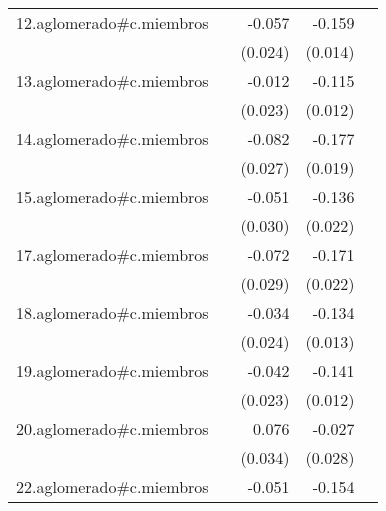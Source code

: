 {\begin{longtable}{l*{4}{D{.}{.}{-1}}}
\addlinespace
12.aglomerado#c.miembros&                     &      -0.057\sym{*}  &      -0.159\sym{***}&                     \\
            &                     &     (0.024)         &     (0.014)         &                     \\
\addlinespace
13.aglomerado#c.miembros&                     &      -0.012         &      -0.115\sym{***}&                     \\
            &                     &     (0.023)         &     (0.012)         &                     \\
\addlinespace
14.aglomerado#c.miembros&                     &      -0.082\sym{**} &      -0.177\sym{***}&                     \\
            &                     &     (0.027)         &     (0.019)         &                     \\
\addlinespace
15.aglomerado#c.miembros&                     &      -0.051         &      -0.136\sym{***}&                     \\
            &                     &     (0.030)         &     (0.022)         &                     \\
\addlinespace
17.aglomerado#c.miembros&                     &      -0.072\sym{*}  &      -0.171\sym{***}&                     \\
            &                     &     (0.029)         &     (0.022)         &                     \\
\addlinespace
18.aglomerado#c.miembros&                     &      -0.034         &      -0.134\sym{***}&                     \\
            &                     &     (0.024)         &     (0.013)         &                     \\
\addlinespace
19.aglomerado#c.miembros&                     &      -0.042         &      -0.141\sym{***}&                     \\
            &                     &     (0.023)         &     (0.012)         &                     \\
\addlinespace
20.aglomerado#c.miembros&                     &       0.076\sym{*}  &      -0.027         &                     \\
            &                     &     (0.034)         &     (0.028)         &                     \\
\addlinespace
22.aglomerado#c.miembros&                     &      -0.051\sym{*}  &      -0.154\sym{***}&                     \\

\end{longtable}}
